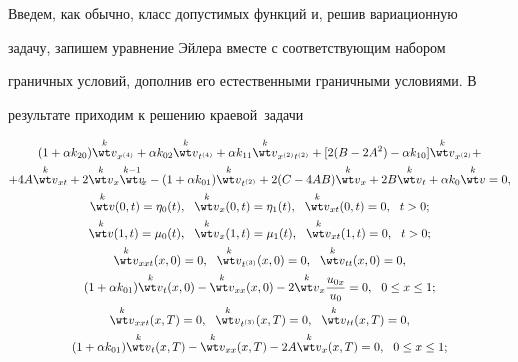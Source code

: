 Введем, как обычно, класс допустимых функций и, решив вариационную 


задачу, запишем уравнение Эйлера вместе с соответствующим набором 


граничных условий, дополнив его естественными граничными условиями. В 


результате приходим к решению {\mbox краевой~задачи} 


\begin{gather*} 


(1+\alpha k_{20})\up{k}{\wt v}_{x^{(4)}}+\alpha k_{02} 


\up{k}{\wt v}_{t^{(4)}}+\alpha k_{11} 


\up{k}{\wt v}_{x^{(2)}t^{(2)}}+[2(B-2A^2)-\alpha k_{10}] 


\up{k}{\wt v}_{x^{(2)}}+ \\ 


% 


+4A\up{k}{\wt v}_{xt}+2\up{k}{\wt v}_x 


\up{k-1}{\wt v}_{\!\!x}-(1+\alpha k_{01}) 


\up{k}{\wt v}_{t^{(2)}}+2(C-4AB)\up{k}{\wt v}_x 


+2B\up{k}{\wt v}_t+\alpha k_0\up{k}{\wt v}=0, \\ 


% 


\up{k}{\wt v}(0,t)=\eta_0(t),\ \ \up{k}{\wt v}_x(0,t)=\eta_1(t), 


\ \ \up{k}{\wt v}_{xt}(0,t)=0,\ \ t>0; \\ 


% 


\up{k}{\wt v}(1,t)=\mu_0(t),\ \ \up{k}{\wt v}_x(1,t)=\mu_1(t), 


\ \ \up{k}{\wt v}_{xt}(1,t)=0,\ \ t>0; \\ 


% 


\up{k}{\wt v}_{xx t}(x,0)=0,\ \ \up{k}{\wt v}_{t^{(3)}}(x,0)=0, 


\ \ \up{k}{\wt v}_{tt}(x,0)=0, \\ 


% 


(1+\alpha k_{01})\up{k}{\wt v}_t(x,0)- 


\up{k}{\wt v}_{xx}(x,0)-2\up{k}{\wt v}_x 


\frac{u_{0x}}{u_0}=0,\ \ 0\le x\le 1; \\ 


% 


\up{k}{\wt v}_{xx t}(x,T)=0,\ \ \up{k}{\wt v}_{t^{(3)}}(x,T)=0, 


\ \ \up{k}{\wt v}_{tt}(x,T)=0, \\ 


% 


(1+\alpha k_{01})\up{k}{\wt v}_t(x,T)-\up{k}{\wt v}_{xx}(x,T) 


-2A\up{k}{\wt v}_x(x,T)=0,\ \ 0\le x\le 1; 


\end{gather*} 


